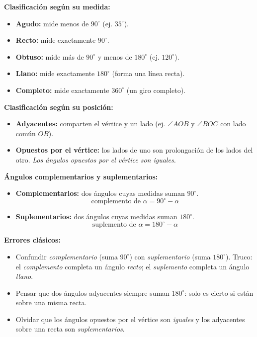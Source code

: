 \documentclass[12pt, letterpaper]{article}
\begin{document}
\newpage %

\begin{cuadroteoria}
  \textbf{Clasificación según su medida:}
  \begin{itemize}[leftmargin=*]
    \item \textbf{Agudo:} mide menos de $90^{\circ}$ (ej. $35^{\circ}$).
    \item \textbf{Recto:} mide exactamente $90^{\circ}$.
    \item \textbf{Obtuso:} mide más de $90^{\circ}$ y menos de $180^{\circ}$ (ej. $120^{\circ}$).
    \item \textbf{Llano:} mide exactamente $180^{\circ}$ (forma una línea recta).
    \item \textbf{Completo:} mide exactamente $360^{\circ}$ (un giro completo).
  \end{itemize}

  \textbf{Clasificación según su posición:}
  \begin{itemize}[leftmargin=*]
    \item \textbf{Adyacentes:} comparten el vértice y un lado (ej. $\angle AOB$ y $\angle BOC$ con lado común $OB$).
    \item \textbf{Opuestos por el vértice:} los lados de uno son prolongación de los lados del otro. \emph{Los ángulos opuestos por el vértice son iguales.}
  \end{itemize}
\end{cuadroteoria}

\begin{cuadroteoria}
  \textbf{Ángulos complementarios y suplementarios:}
  \begin{itemize}[leftmargin=*]
    \item \textbf{Complementarios:} dos ángulos cuyas medidas suman $90^{\circ}$.
          $$\text{complemento de } \alpha = 90^{\circ} - \alpha$$
    \item \textbf{Suplementarios:} dos ángulos cuyas medidas suman $180^{\circ}$.
          $$\text{suplemento de } \alpha = 180^{\circ} - \alpha$$
  \end{itemize}
\end{cuadroteoria}

\begin{cuadroadvertencia}
  \textbf{Errores clásicos:}
  \begin{itemize}[leftmargin=*]
    \item Confundir \emph{complementario} (suma $90^{\circ}$) con \emph{suplementario} (suma $180^{\circ}$). Truco: el \emph{complemento} completa un ángulo \emph{recto}; el \emph{suplemento} completa un ángulo \emph{llano}.
    \item Pensar que dos ángulos adyacentes siempre suman $180^{\circ}$: solo es cierto si están sobre una misma recta.
    \item Olvidar que los ángulos opuestos por el vértice son \emph{iguales} y los adyacentes sobre una recta son \emph{suplementarios}.
  \end{itemize}
\end{cuadroadvertencia}
\end{document}
